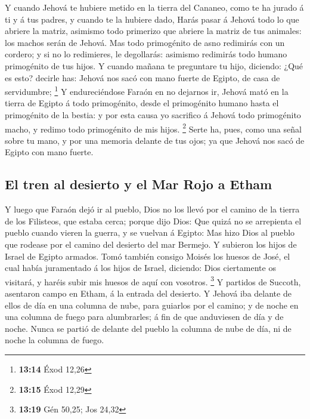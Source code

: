  Y cuando Jehová te hubiere metido en la tierra del
Cananeo, como te ha jurado á ti y á tus padres, y cuando te la hubiere
dado,  Harás pasar á Jehová todo lo que abriere la
matriz, asimismo todo primerizo que abriere la matriz de tus animales:
los machos serán de Jehová.  Mas todo primogénito de asno
redimirás con un cordero; y si no lo redimieres, le degollarás: asimismo
redimirás todo humano primogénito de tus hijos.  Y cuando
mañana te preguntare tu hijo, diciendo: ¿Qué es esto? decirle has:
Jehová nos sacó con mano fuerte de Egipto, de casa de servidumbre;
\footnote{\textbf{13:14} Éxod 12,26}  Y endureciéndose
Faraón en no dejarnos ir, Jehová mató en la tierra de Egipto á todo
primogénito, desde el primogénito humano hasta el primogénito de la
bestia: y por esta causa yo sacrifico á Jehová todo primogénito macho, y
redimo todo primogénito de mis hijos. \footnote{\textbf{13:15} Éxod
  12,29}  Serte ha, pues, como una señal sobre tu mano, y
por una memoria delante de tus ojos; ya que Jehová nos sacó de Egipto
con mano fuerte.

\hypertarget{el-tren-al-desierto-y-el-mar-rojo-a-etham}{%
\subsection{El tren al desierto y el Mar Rojo a
Etham}\label{el-tren-al-desierto-y-el-mar-rojo-a-etham}}

 Y luego que Faraón dejó ir al pueblo, Dios no los llevó
por el camino de la tierra de los Filisteos, que estaba cerca; porque
dijo Dios: Que quizá no se arrepienta el pueblo cuando vieren la guerra,
y se vuelvan á Egipto:  Mas hizo Dios al pueblo que
rodease por el camino del desierto del mar Bermejo. Y subieron los hijos
de Israel de Egipto armados.  Tomó también consigo Moisés
los huesos de José, el cual había juramentado á los hijos de Israel,
diciendo: Dios ciertamente os visitará, y haréis subir mis huesos de
aquí con vosotros. \footnote{\textbf{13:19} Gén 50,25; Jos 24,32}
 Y partidos de Succoth, asentaron campo en Etham, á la
entrada del desierto.  Y Jehová iba delante de ellos de
día en una columna de nube, para guiarlos por el camino; y de noche en
una columna de fuego para alumbrarles; á fin de que anduviesen de día y
de noche.  Nunca se partió de delante del pueblo la
columna de nube de día, ni de noche la columna de fuego.

